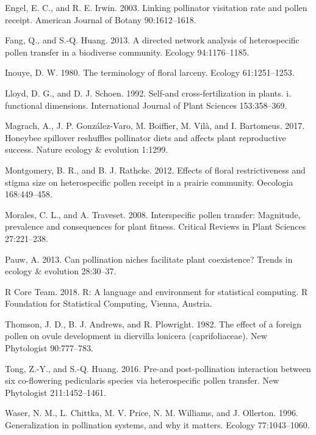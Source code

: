 \documentclass[11pt,a4paper]{article}
\begin{document}
\hypertarget{ref-engel2003}{}
Engel, E. C., and R. E. Irwin. 2003. Linking pollinator visitation rate
and pollen receipt. American Journal of Botany 90:1612--1618.

\hypertarget{ref-fang2013}{}
Fang, Q., and S.-Q. Huang. 2013. A directed network analysis of
heterospecific pollen transfer in a biodiverse community. Ecology
94:1176--1185.

\hypertarget{ref-inouye1980}{}
Inouye, D. W. 1980. The terminology of floral larceny. Ecology
61:1251--1253.

\hypertarget{ref-lloyd1992}{}
Lloyd, D. G., and D. J. Schoen. 1992. Self-and cross-fertilization in
plants. i. functional dimensions. International Journal of Plant
Sciences 153:358--369.

\hypertarget{ref-magrach2017}{}
Magrach, A., J. P. González-Varo, M. Boiffier, M. Vilà, and I.
Bartomeus. 2017. Honeybee spillover reshuffles pollinator diets and
affects plant reproductive success. Nature ecology \& evolution 1:1299.

\hypertarget{ref-montgomery2012}{}
Montgomery, B. R., and B. J. Rathcke. 2012. Effects of floral
restrictiveness and stigma size on heterospecific pollen receipt in a
prairie community. Oecologia 168:449--458.

\hypertarget{ref-morales2008}{}
Morales, C. L., and A. Traveset. 2008. Interspecific pollen transfer:
Magnitude, prevalence and consequences for plant fitness. Critical
Reviews in Plant Sciences 27:221--238.

\hypertarget{ref-pauw2013}{}
Pauw, A. 2013. Can pollination niches facilitate plant coexistence?
Trends in ecology \& evolution 28:30--37.

\hypertarget{ref-R_Core_Team_2018}{}
R Core Team. 2018. R: A language and environment for statistical
computing. R Foundation for Statistical Computing, Vienna, Austria.

\hypertarget{ref-thomson1982}{}
Thomson, J. D., B. J. Andrews, and R. Plowright. 1982. The effect of a
foreign pollen on ovule development in diervilla lonicera
(caprifoliaceae). New Phytologist 90:777--783.

\hypertarget{ref-tong2016}{}
Tong, Z.-Y., and S.-Q. Huang. 2016. Pre-and post-pollination interaction
between six co-flowering pedicularis species via heterospecific pollen
transfer. New Phytologist 211:1452--1461.

\hypertarget{ref-waser1996}{}
Waser, N. M., L. Chittka, M. V. Price, N. M. Williams, and J. Ollerton.
1996. Generalization in pollination systems, and why it matters. Ecology
77:1043--1060.
\end{document}
